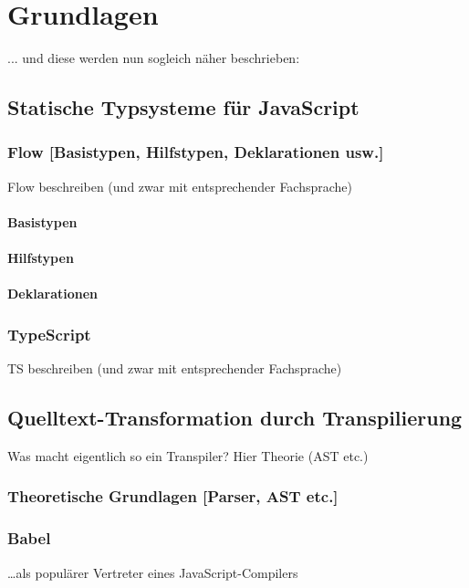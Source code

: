 \chapter{Grundlagen}

... und diese werden nun sogleich näher beschrieben:

\section{Statische Typsysteme für JavaScript}

  \subsection{Flow [Basistypen, Hilfstypen, Deklarationen usw.]}
    Flow beschreiben (und zwar mit entsprechender Fachsprache)

    \subsubsection{Basistypen}
    \subsubsection{Hilfstypen}
    \subsubsection{Deklarationen}

  \subsection{TypeScript}
    TS beschreiben (und zwar mit entsprechender Fachsprache)

\section{Quelltext-Transformation durch Transpilierung}

  Was macht eigentlich so ein Transpiler? Hier Theorie (AST etc.)

  \subsection{Theoretische Grundlagen [Parser, AST etc.]}
  \subsection{Babel}

  \dots als populärer Vertreter eines JavaScript-Compilers
